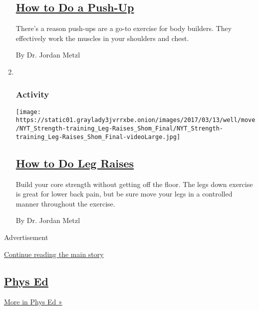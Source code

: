 \begin{enumerate}
  \hypertarget{how-to-do-a-push-up}{%
  \subsection{\texorpdfstring{\href{/interactive/2017/well/move/how-to-do-a-pushup.html}{How
  to Do a Push-Up}}{How to Do a Push-Up}}\label{how-to-do-a-push-up}}

  There's a reason push-ups are a go-to exercise for body builders. They
  effectively work the muscles in your shoulders and chest.

  By Dr. Jordan Metzl
\item ~
  \hypertarget{activity-4}{%
  \subsubsection{Activity}\label{activity-4}}

  \texttt{[image: https://static01.graylady3jvrrxbe.onion/images/2017/03/13/well/move/NYT\_Strength-training\_Leg-Raises\_Shom\_Final/NYT\_Strength-training\_Leg-Raises\_Shom\_Final-videoLarge.jpg]}

  \hypertarget{how-to-do-leg-raises}{%
  \subsection{\texorpdfstring{\href{/interactive/2017/well/move/how-to-do-leg-raises.html}{How
  to Do Leg Raises}}{How to Do Leg Raises}}\label{how-to-do-leg-raises}}

  Build your core strength without getting off the floor. The legs down
  exercise is great for lower back pain, but be sure move your legs in a
  controlled manner throughout the exercise.

  By Dr. Jordan Metzl
\end{enumerate}

Advertisement

\protect\hyperlink{after-mid1}{Continue reading the main story}

\hypertarget{phys-ed-4}{%
\subsection{\texorpdfstring{\href{/column/phys-ed}{Phys
Ed}}{Phys Ed}}\label{phys-ed-4}}

\href{/column/phys-ed}{More in Phys Ed »}

